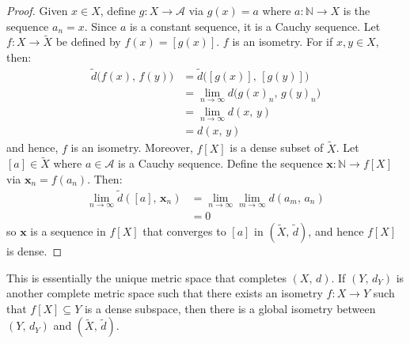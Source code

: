 \documentclass{article}
\theoremstyle{plain}
\theoremstyle{normal}
\begin{document}
    \begin{proof}
        Given $x\in{X}$, define $g:X\rightarrow\mathcal{A}$ via
        $g(x)=a$ where $a:\mathbb{N}\rightarrow{X}$ is the sequence
        $a_{n}=x$. Since $a$ is a constant sequence, it is a Cauchy sequence.
        Let $f:X\rightarrow\tilde{X}$ be defined by
        $f(x)=[g(x)]$. $f$ is an isometry. For if $x,y\in{X}$, then:
        \begin{align}
            \tilde{d}\big(f(x),\,f(y)\big)
            &=\tilde{d}\big([g(x)],\,[g(y)]\big)\\
            &=\lim_{n\rightarrow\infty}d\big(g(x)_{n},\,g(y)_{n}\big)\\
            &=\lim_{n\rightarrow\infty}d(x,\,y)\\
            &=d(x,\,y)
        \end{align}
        and hence, $f$ is an isometry. Moreover, $f[X]$ is a dense subset of
        $\tilde{X}$. Let $[a]\in\tilde{X}$ where $a\in\mathcal{A}$
        is a Cauchy sequence. Define the
        sequence $\mathbf{x}:\mathbb{N}\rightarrow{f}[X]$ via
        $\mathbf{x}_{n}=f(a_{n})$. Then:
        \begin{align}
            \lim_{n\rightarrow\infty}\tilde{d}([a],\,\mathbf{x}_{n})
            &=\lim_{n\rightarrow\infty}
                \lim_{m\rightarrow\infty}d(a_{m},\,a_{n})\\
            &=0
        \end{align}
        so $\mathbf{x}$ is a sequence in $f[X]$ that converges to
        $[a]$ in $(\tilde{X},\,\tilde{d})$, and hence $f[X]$ is dense.
    \end{proof}
    This is essentially the unique metric space that completes
    $(X,\,d)$. If $(Y,\,d_{Y})$ is another complete metric space such that
    there exists an isometry $f:X\rightarrow{Y}$ such that
    $f[X]\subseteq{Y}$ is a dense subspace, then there is a global
    isometry between $(Y,\,d_{Y})$ and $(\tilde{X},\,\tilde{d})$.
\end{document}
